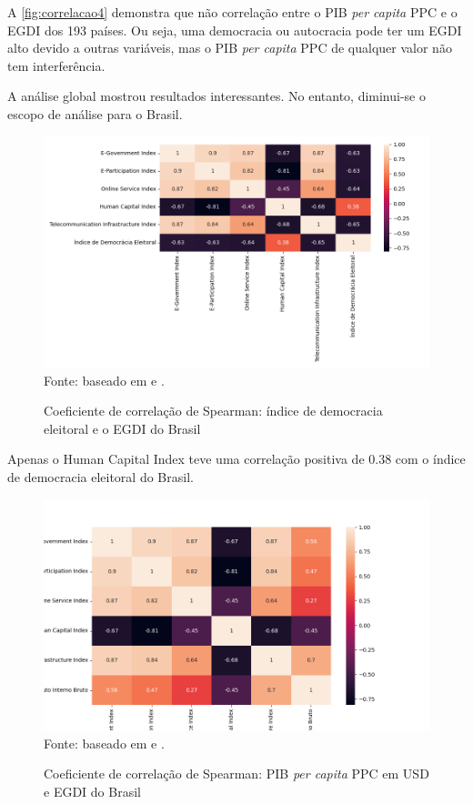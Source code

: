 A \ref{fig:correlacao4} demonstra que não correlação entre o PIB \textit{per capita} PPC e o EGDI dos 193 países. Ou seja, uma democracia ou autocracia pode ter um EGDI alto devido a outras variáveis, mas o PIB \textit{per capita} PPC de qualquer valor não tem interferência.

A análise global mostrou resultados interessantes. No entanto, diminui-se o escopo de análise para o Brasil.

\begin{figure}[H]
    \centering
    \caption{Coeficiente de correlação de Spearman: índice de democracia eleitoral e o EGDI do Brasil}
    \includegraphics[width=1\linewidth]{figuras/egdi/correlacao8.png}
    \label{fig:correlacao8}
    \footnotesize{Fonte: baseado em \cite{ONU_edgi_mapa} e \cite{electoral_democracy_index}.}
\end{figure}

Apenas o Human Capital Index teve uma correlação positiva de 0.38 com o índice de democracia eleitoral do Brasil.

\begin{figure}[H]
    \centering
    \caption{Coeficiente de correlação de Spearman: PIB \textit{per capita} PPC em USD e EGDI do Brasil}
    \includegraphics[width=1\linewidth]{figuras/egdi/correlacao6.png}
    \label{fig:correlacao6}
    \footnotesize{Fonte: baseado em \cite{ONU_edgi_mapa} e \cite{WB_pib_per_capita_países}.}
\end{figure}


